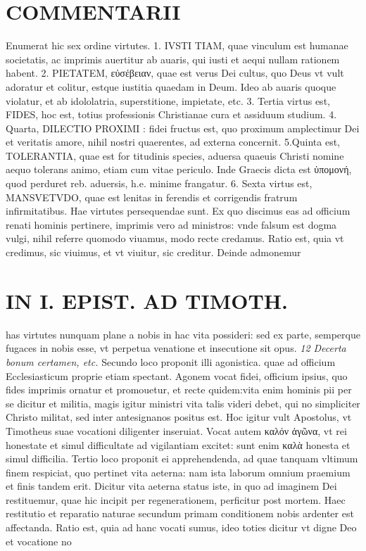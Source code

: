 \documentclass{article}
\begin{document}
\begin{pages}
\section*{COMMENTARII }
\marginpar{[ p.160 ]}\pstart Enumerat hic sex ordine virtutes. 1. IVSTI TIAM, quae vinculum est humanae societatis, ac imprimis auertitur ab auaris, qui iusti et aequi nullam rationem habent. 2. PIETATEM, εὐσέβειαν, quae est verus Dei cultus, quo Deus vt vult adoratur et colitur, estque iustitia quaedam in Deum. Ideo ab auaris quoque violatur, et ab idololatria, superstitione, impietate, etc. 3. Tertia virtus est, FIDES, hoc est, totius professionis Christianae cura et assiduum studium. 4. Quarta, DILECTIO PROXIMI : fidei fructus est, quo proximum amplectimur Dei et veritatis amore, nihil nostri quaerentes, ad externa concernit. 5.Quinta est, TOLERANTIA, quae est for titudinis species, aduersa quaeuis Christi nomine aequo tolerans animo, etiam cum vitae periculo. Inde Graecis dicta est ὑπομονή, quod perduret reb. aduersis, h.e. minime frangatur. 6. Sexta virtus est, MANSVETVDO, quae est lenitas in ferendis et corrigendis fratrum infirmitatibus. Hae virtutes persequendae sunt. Ex quo discimus eas ad officium renati hominis pertinere, imprimis vero ad ministros: vnde falsum est dogma vulgi, nihil referre quomodo viuamus, modo recte credamus.  \pend\pstart Ratio est, quia vt credimus, sic viuimus, et vt viuitur, sic creditur. Deinde admonemur  \pend
\section*{IN I. EPIST. AD TIMOTH. }
\marginpar{[ p.161 ]}\pstart has virtutes nunquam plane a nobis in hac vita possideri: sed ex parte, semperque fugaces in nobis esse, vt perpetua venatione et insecutione sit opus.  \pend
\textit{12 Decerta bonum certamen, etc. }\pstart Secundo loco proponit illi agonistica. quae ad officium Ecclesiasticum proprie etiam spectant. Agonem vocat fidei, officium ipsius, quo fides imprimis ornatur et promouetur, et recte quidem:vita enim hominis pii per se dicitur et militia, magis igitur ministri vita talis videri debet, qui no simpliciter Christo militat, sed inter antesignanos positus est. Hoc igitur vult Apostolus, vt Timotheus suae vocationi diligenter inseruiat. Vocat autem καλόν ἀγῶνα, vt rei honestate et simul difficultate ad vigilantiam excitet: sunt enim καλὰ honesta et simul difficilia.  \pend\pstart Tertio loco proponit ei apprehendenda, ad quae tanquam vltimum finem respiciat, quo pertinet vita aeterna: nam ista laborum omnium praemium et finis tandem erit. Dicitur vita aeterna status iste, in quo ad imaginem Dei restituemur, quae hic incipit per regenerationem, perficitur post mortem. Haec restitutio et reparatio naturae secundum primam conditionem nobis ardenter est affectanda. Ratio est, quia ad hanc vocati sumus, ideo toties dicitur vt digne Deo et vocatione no\pend

\end{pages}
\end{document}
